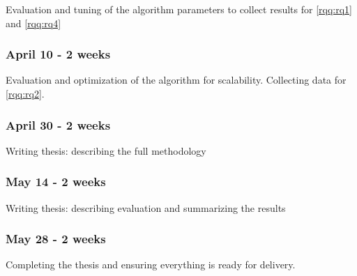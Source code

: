 \documentclass[
acmsmall,
nonacm,
screen,
acmthm]{acmart}
\begin{document}
Evaluation and tuning of the algorithm parameters to collect results for
\cref{rqq:rq1} and \cref{rqq:rq4}

\hypertarget{april-10---2-weeks}{%
\subsubsection{April 10 - 2 weeks}\label{april-10---2-weeks}}

Evaluation and optimization of the algorithm for scalability. Collecting
data for \cref{rqq:rq2}.

\hypertarget{april-30---2-weeks}{%
\subsubsection{April 30 - 2 weeks}\label{april-30---2-weeks}}

Writing thesis: describing the full methodology

\hypertarget{may-14---2-weeks}{%
\subsubsection{May 14 - 2 weeks}\label{may-14---2-weeks}}

Writing thesis: describing evaluation and summarizing the results

\hypertarget{may-28---2-weeks}{%
\subsubsection{May 28 - 2 weeks}\label{may-28---2-weeks}}

Completing the thesis and ensuring everything is ready for delivery.


\end{document}
